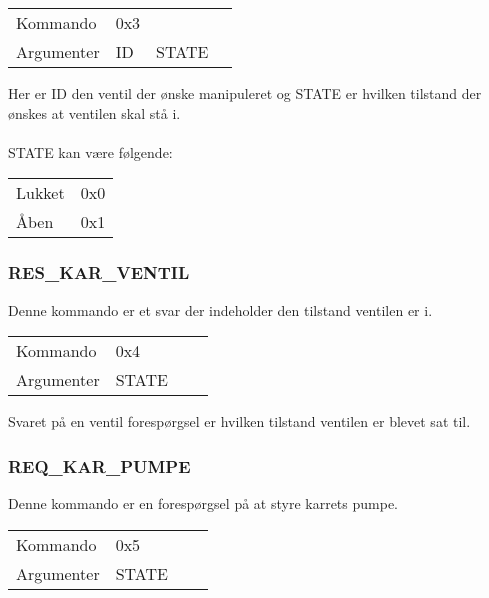\begin{table}[H]
\setlength{\parindent}{12pt}
\begin{tabular}{|l|lcc|}
Kommando & 0x3 & & \\
Argumenter & ID & STATE & \\
\end{tabular}
\end{table}

Her er ID den ventil der ønske manipuleret og STATE er hvilken tilstand der ønskes at ventilen skal stå i.\\\\
STATE kan være følgende:
\begin{table}[H]
\setlength{\parindent}{12pt}
\begin{tabular}{|l|l|}
Lukket & 0x0 \\
Åben & 0x1 \\
\end{tabular}
\end{table}

\subsubsection{RES\_KAR\_VENTIL}
Denne kommando er et svar der indeholder den tilstand ventilen er i.

\begin{table}[H]
\setlength{\parindent}{12pt}
\begin{tabular}{|l|lcc|}
Kommando & 0x4 & & \\
Argumenter & STATE & & \\
\end{tabular}
\end{table}

Svaret på en ventil forespørgsel er hvilken tilstand ventilen er blevet sat til.

\subsubsection{REQ\_KAR\_PUMPE}
Denne kommando er en forespørgsel på at styre karrets pumpe.

\begin{table}[H]
\setlength{\parindent}{12pt}
\begin{tabular}{|l|lcc|}
Kommando & 0x5 & & \\
Argumenter & STATE & & \\
\end{tabular}
\end{table}


